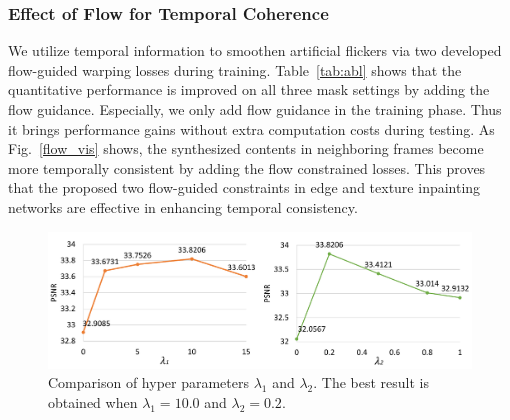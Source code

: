 \subsubsection{Effect of Flow for Temporal Coherence}

We utilize temporal information to smoothen artificial flickers via two developed flow-guided warping losses during training. 
Table~\ref{tab:abl} shows that the quantitative performance is improved on all three mask settings by adding the flow guidance. 
Especially, we only add flow guidance in the training phase. 
Thus it brings performance gains without extra computation costs during testing.
%
As Fig.~\ref{flow_vis} shows, the synthesized contents in neighboring frames become more temporally consistent by adding the flow constrained losses.
This proves that the proposed two flow-guided constraints in edge and texture inpainting networks are effective in enhancing temporal consistency.


\begin{figure}[t]
	\centering
	\includegraphics[width=1.0\columnwidth]{lamda1} %
	\caption{Comparison of hyper parameters $\lambda_1$ and $\lambda_2$. The best result is obtained when $\lambda_1=10.0$ and $\lambda_2=0.2$.}
	\label{fig:hparam}
\end{figure}




